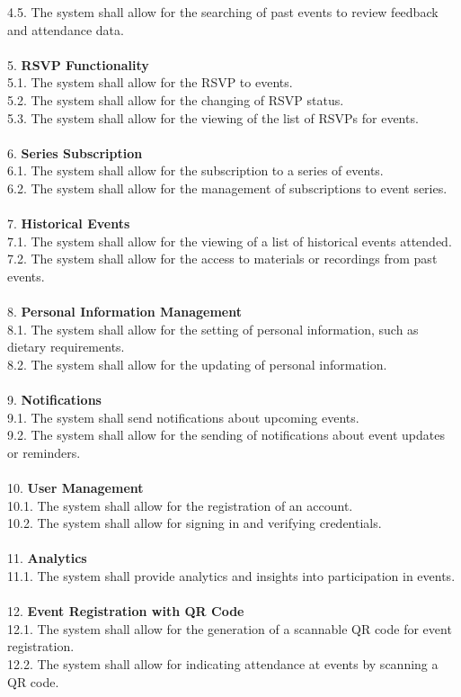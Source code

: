 \documentclass[a4paper,12pt]{article}
\begin{document}
    4.5. The system shall allow for the searching of past events to review feedback and attendance data.\\\\
5. \textbf{RSVP Functionality}\\
    5.1. The system shall allow for the RSVP to events.\\
    5.2. The system shall allow for the changing of RSVP status.\\
    5.3. The system shall allow for the viewing of the list of RSVPs for events.\\\\
6. \textbf{Series Subscription}\\
    6.1. The system shall allow for the subscription to a series of events.\\
    6.2. The system shall allow for the management of subscriptions to event series.\\\\
7. \textbf{Historical Events}\\
    7.1. The system shall allow for the viewing of a list of historical events attended.\\
    7.2. The system shall allow for the access to materials or recordings from past events.\\\\
8. \textbf{Personal Information Management}\\
    8.1. The system shall allow for the setting of personal information, such as dietary requirements.\\
    8.2. The system shall allow for the updating of personal information.\\\\
9. \textbf{Notifications}\\
    9.1. The system shall send notifications about upcoming events.\\
    9.2. The system shall allow for the sending of notifications about event updates or reminders.\\\\
10. \textbf{User Management}\\
    10.1. The system shall allow for the registration of an account.\\
    10.2. The system shall allow for signing in and verifying credentials.\\\\
11. \textbf{Analytics}\\
    11.1. The system shall provide analytics and insights into participation in events.\\\\
12. \textbf{Event Registration with QR Code}\\
    12.1. The system shall allow for the generation of a scannable QR code for event registration.\\
    12.2. The system shall allow for indicating attendance at events by scanning a QR code.\\
\end{document}
